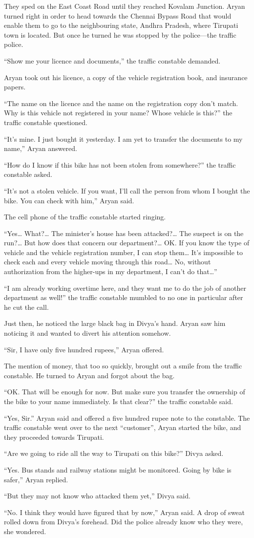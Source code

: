 They sped on the East Coast Road until they reached Kovalam Junction. Aryan
turned right in order to head towards the Chennai Bypass Road that would enable
them to go to the neighbouring state, Andhra Pradesh, where Tirupati town is
located. But once he turned he was stopped by the police—the traffic police.

“Show me your licence and documents,” the traffic constable demanded.

Aryan took out his licence, a copy of the vehicle registration book, and insurance
papers.

“The name on the licence and the name on the registration copy don't match. Why
is this vehicle not registered in your name? Whose vehicle is this?” the traffic
constable questioned.

“It's mine. I just bought it yesterday. I am yet to transfer the documents to my
name,” Aryan answered.

“How do I know if this bike has not been stolen from somewhere?” the traffic
constable asked.

“It's not a stolen vehicle. If you want, I'll call the person from whom I bought
the bike. You can check with him,” Aryan said.

The cell phone of the traffic constable started ringing.

“Yes… What?… The minister's house has been attacked?… The suspect is on
the run?… But how does that concern our department?… OK. If you know the
type of vehicle and the vehicle registration number, I can stop them… It's
impossible to check each and every vehicle moving through this road… No,
without authorization from the higher-ups in my department, I can't do that…”

“I am already working overtime here, and they want me to do the job of another
department as well!” the traffic constable mumbled to no one in particular
after he cut the call.

Just then, he noticed the large black bag in Divya's hand. Aryan saw him noticing
it and wanted to divert his attention somehow.

“Sir, I have only five hundred rupees,” Aryan offered.

The mention of money, that too so quickly, brought out a smile from the traffic
constable. He turned to Aryan and forgot about the bag.

“OK. That will be enough for now. But make sure you transfer the ownership of
the bike to your name immediately. Is that clear?” the traffic constable said.

“Yes, Sir.” Aryan said and offered a five hundred rupee note to the constable.
The traffic constable went over to the next ``customer'', Aryan started the bike,
and they proceeded towards Tirupati.

“Are we going to ride all the way to Tirupati on this bike?” Divya asked.

“Yes. Bus stands and railway stations might be monitored. Going by bike is safer,”
Aryan replied.

“But they may not know who attacked them yet,” Divya said.

“No. I think they would have figured that by now,” Aryan said. A drop of sweat
rolled down from Divya's forehead. Did the police already know who they were,
she wondered.